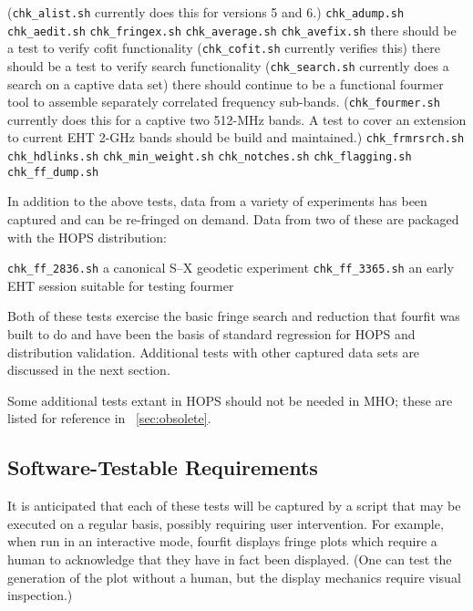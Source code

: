 \begin{description}
    (\texttt{chk\_alist.sh} currently does this for versions 5 and 6.)
    \texttt{chk\_adump.sh}
    \texttt{chk\_aedit.sh}
    \texttt{chk\_fringex.sh}
    \texttt{chk\_average.sh}
    \texttt{chk\_avefix.sh}
 there should be a test to verify \acs{cofit} functionality
    (\texttt{chk\_cofit.sh} currently verifies this)
 there should be a test to verify \acs{search} functionality
    (\texttt{chk\_search.sh} currently does a search on a captive
    data set)
 there should continue to be a functional \acs{fourmer} tool
    to assemble separately correlated frequency sub-bands.
    (\texttt{chk\_fourmer.sh} currently does this for a
    captive two 512-MHz bands.  A test to cover an extension
    to current \acs{EHT} 2-GHz bands should be build and maintained.)
    \texttt{chk\_frmrsrch.sh}
    \texttt{chk\_hdlinks.sh}
    \texttt{chk\_min\_weight.sh}
    \texttt{chk\_notches.sh}
    \texttt{chk\_flagging.sh}
    \texttt{chk\_ff\_dump.sh}
\end{description}


In addition to the above tests, data from a variety of experiments
has been captured and can be re-fringed on demand.  Data from two of
these are packaged with the \ac{HOPS} distribution:
\begin{description}
 \texttt{chk\_ff\_2836.sh} a canonical S--X geodetic experiment
 \texttt{chk\_ff\_3365.sh} an early \ac{EHT} session suitable for
    testing \ac{fourmer}
\end{description}
Both of these tests exercise the basic fringe search and reduction
that \ac{fourfit} was built to do and have been the basis of standard
regression for \ac{HOPS} and distribution validation.   Additional tests
with other captured data sets are discussed in the next section.

Some additional tests extant in \ac{HOPS} should not be needed in
\ac{MHO}; these are listed for reference in \App~\ref{sec:obsolete}.

\subsection{Software-Testable Requirements}
\label{sec:regress}

It is anticipated that each of these tests will be captured by a
script that may be executed on a regular basis, possibly requiring
user intervention.  For example, when run in an interactive mode,
\ac{fourfit} displays fringe plots which require a human to acknowledge
that they have in fact been displayed.  (One can test the generation of
the plot without a human, but the display mechanics require visual
inspection.)

